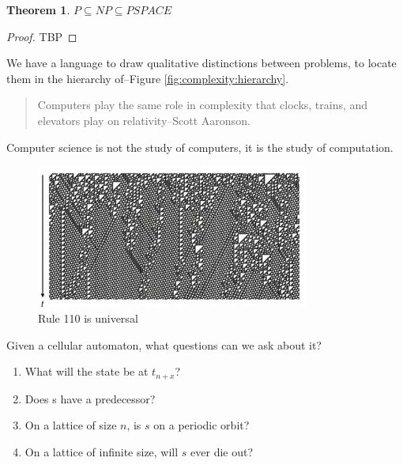 \documentclass[]{article}
\newtheorem{thm}{Theorem}
\begin{document}
\begin{thm}
	$P \subseteq NP \subseteq PSPACE$
\end{thm}

\begin{proof}
	TBP
\end{proof}

We have a language to draw qualitative distinctions between problems, to locate them in the hierarchy of--Figure \ref{fig:complexity:hierarchy}.
\begin{quotation}
	Computers play the same role in complexity that clocks, trains, and elevators play on relativity--Scott Aaronson.
\end{quotation}

Computer science is not the study of computers, it is the study of computation.

\begin{figure}[H]
	\begin{center}
		\caption[Rule 110 is universal]{Rule 110 is universal\cite{cook2004universality}}\label{fig:rule110}
		\includegraphics[width=0.8\textwidth]{rule110}
	\end{center}
\end{figure}

Given a cellular automaton, what questions can we ask about it?

\begin{enumerate}
	\item What will the state be at $t_{n+x}$?

	\item Does s have a predecessor?

	\item On a lattice of size $n$, is $s$ on a periodic orbit?

	\item On a lattice of infinite size, will $s$ ever die out?
	
\end{enumerate}
\end{document}
